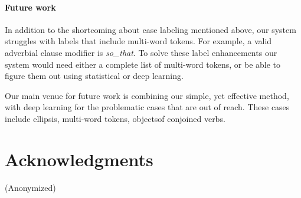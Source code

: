 \documentclass[11pt,a4paper]{article}
\begin{document}
\paragraph{ Future work }


In addition to the shortcoming about case labeling mentioned above,
our system struggles with labels that include multi-word tokens. For
example, a valid adverbial clause modifier is \textit{so\_that}. To
solve these label enhancements our system would need either a complete
list of multi-word tokens, or be able to figure them out using
statistical or deep learning.

Our main venue for future work is combining our simple, yet effective method, with deep learning for the problematic cases that are out of reach. These cases include ellipsis, multi-word tokens, objectsof conjoined verbs.



    
\section*{Acknowledgments}

(Anonymized)



\end{document}
